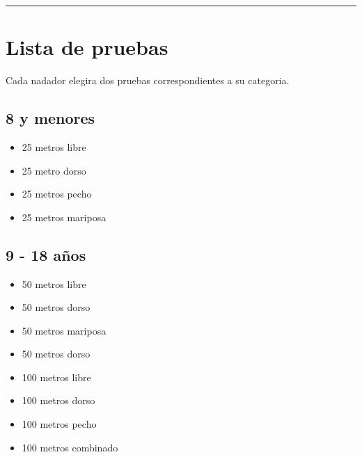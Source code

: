\hrule
\section{Lista de pruebas}
Cada nadador elegira dos pruebas correspondientes a su categoria.
\subsection{8 y menores}
\begin{multicols}{2}
    \begin{center}
        \begin{itemize}
            \item 25 metros libre
            \item 25 metro dorso
            \item 25 metros pecho
            \item 25 metros mariposa
        \end{itemize}
    \end{center}
\end{multicols}
\subsection{9 - 18 años}
\begin{multicols}{2}
    \begin{center}
        \begin{itemize}
            \item 50 metros libre
            \item 50 metros dorso
            \item 50 metros mariposa
            \item 50 metros dorso
            \item 100 metros libre
            \item 100 metros dorso
            \item 100 metros pecho
            \item 100 metros combinado
        \end{itemize}
    \end{center}
\end{multicols}
